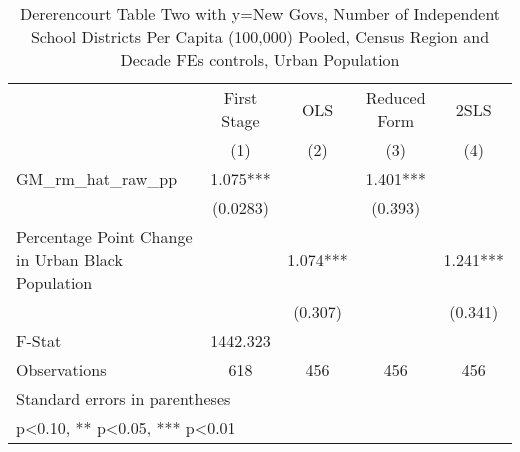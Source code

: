 \begin{table}[htbp]\centering
\def\sym#1{\ifmmode^{#1}\else\(^{#1}\)\fi}
\caption{Dererencourt Table Two with y=New Govs, Number of Independent School Districts Per Capita (100,000) Pooled, Census Region and Decade FEs controls, Urban Population}
\begin{tabular}{l*{4}{c}}
\toprule
                    & First Stage   &         OLS   &Reduced Form   &        2SLS   \\
                    &\multicolumn{1}{c}{(1)}   &\multicolumn{1}{c}{(2)}   &\multicolumn{1}{c}{(3)}   &\multicolumn{1}{c}{(4)}   \\
\midrule
GM\_rm\_hat\_raw\_pp    &       1.075***&               &       1.401***&               \\
                    &    (0.0283)   &               &     (0.393)   &               \\
\addlinespace
Percentage Point Change in Urban Black Population&               &       1.074***&               &       1.241***\\
                    &               &     (0.307)   &               &     (0.341)   \\
\midrule
F-Stat              &    1442.323   &               &               &               \\
Observations        &         618   &         456   &         456   &         456   \\
\bottomrule
\multicolumn{5}{l}{\footnotesize Standard errors in parentheses}\\
\multicolumn{5}{l}{\footnotesize * p<0.10, ** p<0.05, *** p<0.01}\\
\end{tabular}
\end{table}
